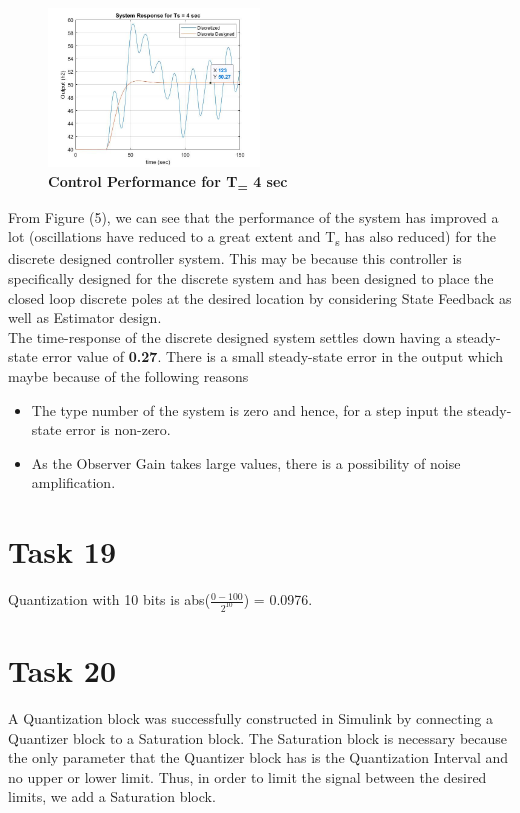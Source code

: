 \documentclass[a4paper,12pt,oneside,onecolumn]{article} %
\begin{document}
\begin{figure}[H]
\centering
  \includegraphics[width = 0.5\textwidth]{ex_18_new}
\caption{\textbf{Control Performance for T\textsubscript = 4 sec}}
 \end{figure}
From Figure (5), we can see that the performance of the system has improved a lot (oscillations have reduced to a great extent and T\textsubscript{s} has also reduced) for the discrete designed controller system. This may be because this controller is specifically designed for the discrete system and has been designed to place the closed loop discrete poles at the desired location by considering State Feedback as well as Estimator design. \\
The time-response of the discrete designed system settles down having a steady-state error value of \textbf {0.27}.  There is a small steady-state error in the output which maybe because of the following reasons
\begin{itemize}
\item The type number of the system is zero and hence, for a step input the steady-state error is non-zero.
\item As the Observer Gain takes large values, there is a possibility of noise amplification.
\end{itemize}

\section*{Task 19}

Quantization with 10 bits is  abs(\(\frac{0-100}{2^{10}}\)) = 0.0976.

\section*{Task 20}

A Quantization block was successfully constructed in Simulink by connecting a Quantizer block to a Saturation block. The Saturation block is necessary because the only parameter that the Quantizer block has is the Quantization Interval and no upper or lower limit. Thus, in order to limit the signal between the desired limits, we add a Saturation block.
\end{document}
